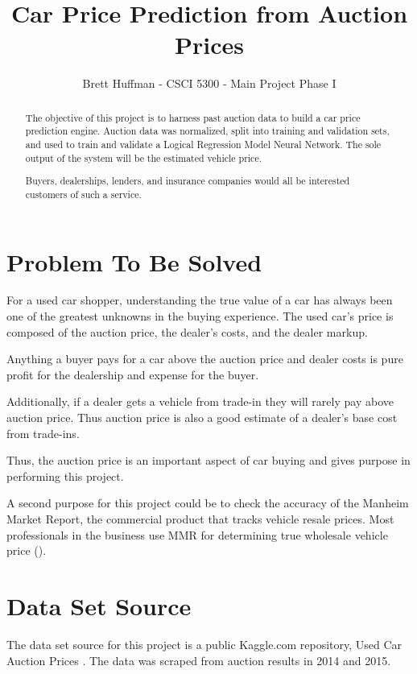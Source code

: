 \documentclass[a4paper,12pt]{article}
\title{Car Price Prediction from Auction Prices}
\author{Brett Huffman - CSCI 5300 - Main Project Phase I}
\date{}
\begin{document}
\maketitle

\begin{abstract}


The objective of this project is to harness past auction data to build a car price prediction engine.  Auction data was normalized, split into training and validation sets, and used to train and validate a Logical Regression Model Neural Network.  The sole output of the system will be the estimated vehicle price.

Buyers, dealerships, lenders, and insurance companies would all be interested customers of such a service.




\end{abstract}

\section{Problem To Be Solved}\label{problem-to-be-solved}

For a used car shopper, understanding the true value of a car has always been one of the greatest unknowns in the buying experience.  The used car's price is composed of the auction price, the dealer's costs, and the dealer markup.

Anything a buyer pays for a car above the auction price and dealer costs is pure profit for the dealership and expense for the buyer.

Additionally, if a dealer gets a vehicle from trade-in they will rarely pay above auction price. Thus auction price is also a good estimate of a dealer's base cost from trade-ins.

Thus, the auction price is an important aspect of car buying and gives purpose in performing this project.

A second purpose for this project could be to check the accuracy of the Manheim Market Report, the commercial product that tracks vehicle resale prices.  Most professionals in the business use MMR for determining true wholesale vehicle price (\cite{proj:manheim}).

\section{Data Set Source}

The data set source for this project is a public Kaggle.com repository, Used Car Auction Prices \cite{proj:auction}.  The data was scraped from auction results in 2014 and 2015.
\end{document}

